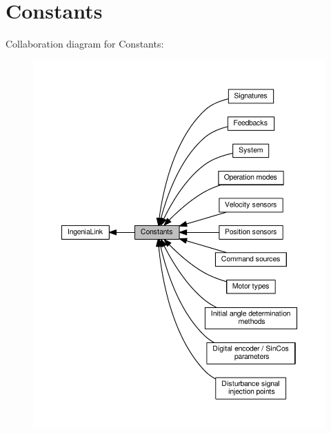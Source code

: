 \hypertarget{group__IL__CONST}{}\section{Constants}
\label{group__IL__CONST}
Collaboration diagram for Constants\+:\nopagebreak
\begin{figure}[H]
\begin{center}
\leavevmode
\includegraphics[width=350pt]{group__IL__CONST}
\end{center}
\end{figure}
